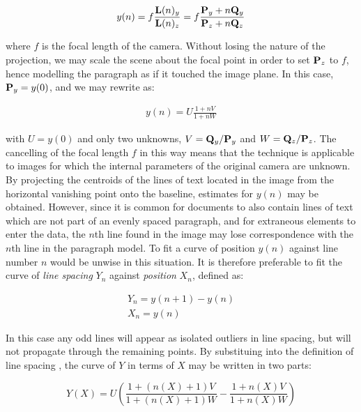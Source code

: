 {\begin{eqnarray}
y(n) = f \frac{ { \bf L }(n)_y }{ { \bf L }(n)_z } = f \frac{ { \bf P }_y + n { \bf Q }_y }{ { \bf P }_z + n{ \bf Q }_z } \label{spacingspq}
\end{eqnarray}

{ \parindent 0mm
where $f$ is the focal length of the camera.  Without losing the nature of the projection, we may scale the scene about the focal point in order to set ${ \bf P }_z$ to $f$, hence modelling the paragraph as if it touched the image plane.  In this case, ${ \bf P }_y=y(0)$,
and we may rewrite  as:
}

\begin{eqnarray}
y(n) = U \frac{ 1 + nV }{ 1 + nW }
\label{spacingsvweqn}
\end{eqnarray}

{ \parindent 0mm
with $U=y(0)$ and only two unknowns,
$V = {{ \bf Q }_y}/{{ \bf P }_y}$ and $W = {{ \bf Q }_z}/{{ \bf P }_z}$.
The cancelling of the focal length $f$ in this way means that the technique is applicable to images for which the internal parameters of the original camera are unknown.
By projecting the centroids of the lines of text located in the image from the horizontal vanishing point onto the baseline, estimates for $y(n)$ may be obtained.
However, since it is common for documents to also contain lines of text which are not part of an evenly spaced paragraph, and for extraneous elements to enter the data, the $n$th line found in the image may lose correspondence with the $n$th line in the paragraph model.
To fit a curve of position $y(n)$ against line number $n$ would be unwise in this situation.
It is therefore preferable to fit the curve of {\em line spacing} $Y_n$
against {\em position} $X_n$, defined as:

\begin{eqnarray}
Y_n=y(n+1)-y(n) \label{linespacingsdefneqn} \\
X_n=y(n) \label{linepositiondefneqn}
\end{eqnarray}

In this case any odd lines will appear as isolated outliers in line spacing, but will not propagate through the remaining points.
By substituing  into the definition of line spacing , the curve of $Y$ in terms of $X$ may be written in two parts:
}

\begin{equation}
Y(X) = U ( \frac{1+(n(X)+1)V}{1+(n(X)+1)W} - \frac{1+n(X)V}{1+n(X)W} )
\label{fittingeqn}
\end{equation}

}
